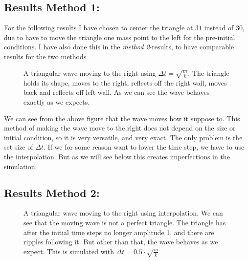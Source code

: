 \documentclass[a4paper,norsk, 10pt]{article}
\begin{document}
\subsection*{Results Method 1:}

For the following results I have chosen to center the triangle at $31$ instead of $30$, due to have to move the triangle one mass point to the left for the pre-initial conditions. I have also done this in the \textit{method 2}-results, to have comparable results for the two methods

\begin{figure}[H]
\captionsetup[subfigure]{position=b}
\centering
{}
\par
{}
\caption{A triangular wave moving to the right using $\Delta t = \sqrt{\frac{m}{k}}$. The triangle holds its shape, moves to the right, reflects off the right wall, moves back and reflects off left wall. As we can see the wave behaves exactly as we expects.}
\end{figure}

We can see from the above figure that the wave moves how it suppose to. This method of making the wave move to the right does not depend on the size or initial condition, so it is very versatile, and very exact. The only problem is the set size of $\Delta t$. If we for some reason want to lower the time step, we have to use the interpolation. But as we will see below this creates imperfections in the simulation.

\subsection*{Results Method 2:}


\begin{figure}[H]
\captionsetup[subfigure]{position=b}
\centering
{}
\par
{}
\caption{A triangular wave moving to the right using interpolation. We can see that the moving wave is not a perfect triangle. The triangle has after the initial time steps no longer amplitude 1, and there are ripples following it. But other than that, the wave behaves as we expect. This is simulated with $\Delta t = 0.5\cdot \sqrt{\frac{m}{k}}$}
\end{figure}
\end{document}
